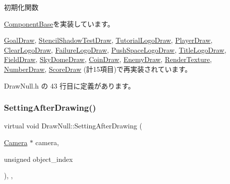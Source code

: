 初期化関数 



\mbox{\hyperlink{class_component_base_a125939d6befe42f28886a6523e86b18b}{Component\+Base}}を実装しています。



\mbox{\hyperlink{class_goal_draw_a3eb0a555fa2db9d2c1253018ea65796e}{Goal\+Draw}}, \mbox{\hyperlink{class_stencil_shadow_test_draw_a65be72e71cd12cacf315b0364c12c3e3}{Stencil\+Shadow\+Test\+Draw}}, \mbox{\hyperlink{class_tutorial_logo_draw_a53fc4b1b23c7f9e249600be67510f944}{Tutorial\+Logo\+Draw}}, \mbox{\hyperlink{class_player_draw_ad79a0fbeb618e0913822b573e5d0be68}{Player\+Draw}}, \mbox{\hyperlink{class_clear_logo_draw_a9af656c0a8ebfb5fa133a0983add6ffd}{Clear\+Logo\+Draw}}, \mbox{\hyperlink{class_failure_logo_draw_a718d587edcabb1feea72153a79a65176}{Failure\+Logo\+Draw}}, \mbox{\hyperlink{class_push_space_logo_draw_a7ad3fe53d9bda4ea16c958bc102ff54e}{Push\+Space\+Logo\+Draw}}, \mbox{\hyperlink{class_title_logo_draw_a9f70fb70639510908f4e07ee14667e30}{Title\+Logo\+Draw}}, \mbox{\hyperlink{class_field_draw_a4287d2ce33033b2413c1d3a81b173373}{Field\+Draw}}, \mbox{\hyperlink{class_sky_dome_draw_a5b82e8b650a20dbc0b7ed720d1fb7fab}{Sky\+Dome\+Draw}}, \mbox{\hyperlink{class_coin_draw_ad0f5da5cfb896541fd59b1ab4a8593d1}{Coin\+Draw}}, \mbox{\hyperlink{class_enemy_draw_aa1659c35fa757db6a6cf07e26ad9ddfb}{Enemy\+Draw}}, \mbox{\hyperlink{class_render_texture_a498eb8be8672e01164b3770cdff43291}{Render\+Texture}}, \mbox{\hyperlink{class_number_draw_ad52c1e8b9ae6e830a82c440cc18cb6c9}{Number\+Draw}}, \mbox{\hyperlink{class_score_draw_af013abb96136825e71d4fee06529fc69}{Score\+Draw}} (計15項目)で再実装されています。



 Draw\+Null.\+h の 43 行目に定義があります。

\mbox{\label{class_draw_null_a76edfc5af0bf3275f96f40394aff8510}} 
\subsubsection{\texorpdfstring{Setting\+After\+Drawing()}{SettingAfterDrawing()}}
{\footnotesize\ttfamily virtual void Draw\+Null\+::\+Setting\+After\+Drawing (\begin{DoxyParamCaption}\item[{\mbox{\hyperlink{class_camera}{Camera}} $\ast$}]{camera,  }\item[{unsigned}]{object\+\_\+index }\end{DoxyParamCaption})\hspace{0.3cm}{\ttfamily [inline]}, {\ttfamily [override]}, {\ttfamily [virtual]}}



